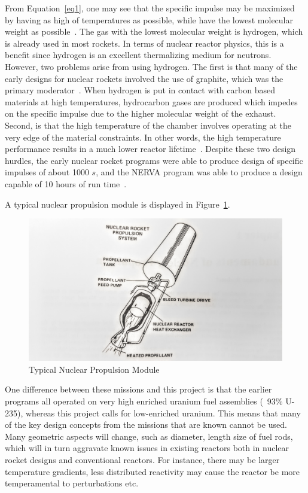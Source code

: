 \documentclass{article}
\begin{document}
From Equation~\ref{eq1}, one may see that the specific impulse may be maximized by having as high of temperatures as possible, while have the lowest molecular weight as possible~\cite{specimp}. The gas with the lowest molecular weight is hydrogen, which is already used in most rockets. In terms of nuclear reactor physics, this is a benefit since hydrogen is an excellent thermalizing medium for neutrons. However, two problems arise from using hydrogen. The first is that many of the early designs for nuclear rockets involved the use of graphite, which was the primary moderator~\cite{matthews1993fuels}. When hydrogen is put in contact with carbon based materials at high temperatures, hydrocarbon gases are produced which impedes on the specific impulse due to the higher molecular weight of the exhaust. Second, is that the high temperature of the chamber involves operating at the very edge of the material constraints. In other words, the high temperature performance results in a much lower reactor lifetime~\cite{lyon1973performance}. Despite these two design hurdles, the early nuclear rocket programs were able to produce design of specific impulses of about 1000 $s$, and the NERVA program was able to produce a design capable of 10 hours of run time~\cite{buden2011space}.

A typical nuclear propulsion module is displayed in Figure~\ref{appAA}.

\begin{figure}[]
	\centering
	\includegraphics[height=0.45\textheight]{fig/appAA}
	\caption[Typical Nuclear Propulsion Module]{Typical Nuclear Propulsion Module~\cite{taub1975review}}
	\label{appAA}
\end{figure}

One difference between these missions and this project is that the earlier programs all operated on very high enriched uranium fuel assemblies (~93\% U-235), whereas this project calls for low-enriched uranium. This means that many of the key design concepts from the missions that are known cannot be used. Many geometric aspects will change, such as diameter, length size of fuel rods, which will in turn aggravate known issues in existing reactors both in nuclear rocket designs and conventional reactors. For instance, there may be larger temperature gradients, less distributed reactivity may cause the reactor be more temperamental to perturbations etc.
\end{document}
